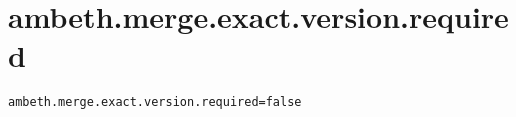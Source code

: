 \section{ambeth.merge.exact.version.required}
\label{configuration:AmbethMergeExactVersionRequired}
\AvailableInJavaAndCsharp{\TODO}
\begin{lstlisting}[style=Props,caption={Usage example for \textit{ambeth.merge.exact.version.required}}]
ambeth.merge.exact.version.required=false
\end{lstlisting}